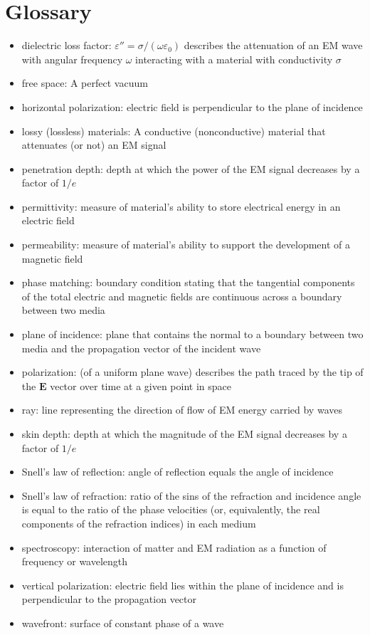 \documentclass[11pt, oneside]{article}
\begin{document}
\section*{Glossary}
\renewcommand\labelitemi{{\boldmath$\cdot$}}
\begin{itemize}
	\item dielectric loss factor: $\varepsilon'' = \sigma/(\omega\varepsilon_0)$ describes the attenuation of an EM wave with angular frequency $\omega$ interacting with a material with conductivity $\sigma$
	\item free space: A perfect vacuum
	\item horizontal polarization: electric field is perpendicular to the plane of incidence
	\item lossy (lossless) materials: A conductive (nonconductive) material that attenuates (or not) an EM signal
	\item penetration depth: depth at which the power of the EM signal decreases by a factor of $1/e$
	\item permittivity: measure of material's ability to store electrical energy in an electric field
	\item permeability: measure of material's ability to support the development of a magnetic field
	\item phase matching: boundary condition stating that the tangential components of the total electric and magnetic fields are continuous across a boundary between two media
	\item plane of incidence: plane that contains the normal to a boundary between two media and the propagation vector of the incident wave
	\item polarization: (of a uniform plane wave) describes the path traced by the tip of the $\mathbf{E}$ vector over time at a given point in space 
	\item ray: line representing the direction of flow of EM energy carried by waves
	\item skin depth: depth at which the magnitude of the EM signal decreases by a factor of $1/e$
	\item Snell's law of reflection: angle of reflection equals the angle of incidence
	\item Snell's law of refraction: ratio of the sins of the refraction and incidence angle is equal to the ratio of the phase velocities (or, equivalently, the real components of the refraction indices) in each medium
	\item spectroscopy: interaction of matter and EM radiation as a function of frequency or wavelength
	\item vertical polarization: electric field lies within the plane of incidence and is perpendicular to the propagation vector
	\item wavefront: surface of constant phase of a wave
\end{itemize}



\end{document}
